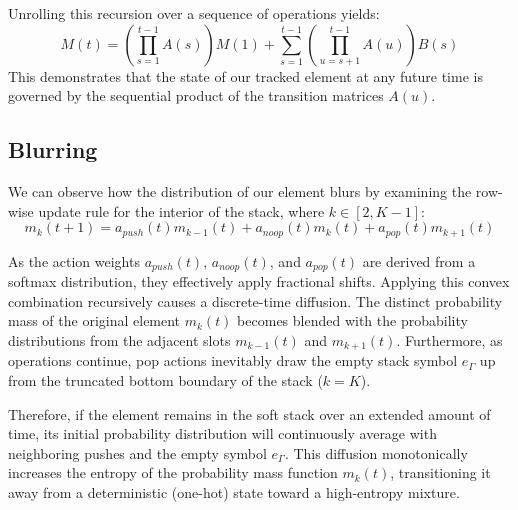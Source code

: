 \documentclass{article}
\begin{document}
Unrolling this recursion over a sequence of operations yields:
\begin{equation*}
M(t) = \left(\prod_{s=1}^{t-1}A(s)\right)M(1) + \sum_{s=1}^{t-1}\left(\prod_{u=s+1}^{t-1}A(u)\right)B(s)
\end{equation*}
This demonstrates that the state of our tracked element at any future time is governed by the sequential product of the transition matrices $A(u)$.

\subsection{Blurring}
We can observe how the distribution of our element blurs by examining the row-wise update rule for the interior of the stack, where $k \in [2, K-1]$:
\begin{equation*}
m_k(t+1) = a_{push}(t)m_{k-1}(t) + a_{noop}(t)m_k(t) + a_{pop}(t)m_{k+1}(t)
\end{equation*}

As the action weights $a_{push}(t)$, $a_{noop}(t)$, and $a_{pop}(t)$ are derived from a softmax distribution, they effectively apply fractional shifts. Applying this convex combination recursively causes a discrete-time diffusion. The distinct probability mass of the original element $m_k(t)$ becomes blended with the probability distributions from the adjacent slots $m_{k-1}(t)$ and $m_{k+1}(t)$. Furthermore, as operations continue, pop actions inevitably draw the empty stack symbol $e_\Gamma$ up from the truncated bottom boundary of the stack ($k=K$). 

Therefore, if the element remains in the soft stack over an extended amount of time, its initial probability distribution will continuously average with neighboring pushes and the empty symbol $e_\Gamma$. This diffusion monotonically increases the entropy of the probability mass function $m_k(t)$, transitioning it away from a deterministic (one-hot) state toward a high-entropy mixture. 
\end{document}
